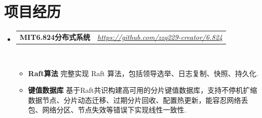 \documentclass[letterpaper,11pt]{article}
\makeatletter
\newcommand{\resumeItem}[2]{
  \item\small{
    \textbf{#1}{ #2 \vspace{-2pt}}
  }
}
\newcommand{\resumeSubheadingtwo}[2]{
  \vspace{-1pt}\item
    \begin{tabular*}{0.97\textwidth}{l@{\extracolsep{\fill}}r}
      \textbf{#1} & \textit{ #2} \\
    \end{tabular*}\vspace{-5pt}
}
\newcommand{\resumeItemListStart}{\vspace{-10pt}\begin{itemize}}
\newcommand{\resumeItemListEnd}{\end{itemize}\vspace{-10pt}}
\makeatother
\begin{document}
\section{项目经历}
    \begin{itemize}[leftmargin=*,itemsep=5pt]
        \resumeSubheadingtwo
            {MIT6.824分布式系统}{\href{https://github.com/zzq229-creator/6.824}{https://github.com/zzq229-creator/6.824}}
            \\[10pt]
            \resumeItemListStart
                \resumeItem{Raft算法}
                    {完整实现 Raft 算法，包括领导选举、日志复制、快照、持久化.}
                \resumeItem{键值数据库}
                    {基于Raft共识构建高可用的分片键值数据库，支持不停机扩缩数据节点、分片动态迁移、过期分片回收、配置热更新，能容忍网络丢包、网络分区、节点失效等错误下实现线性一致性.
                    }
            \resumeItemListEnd

    \end{itemize}

\vspace{-10pt}
\end{document}
